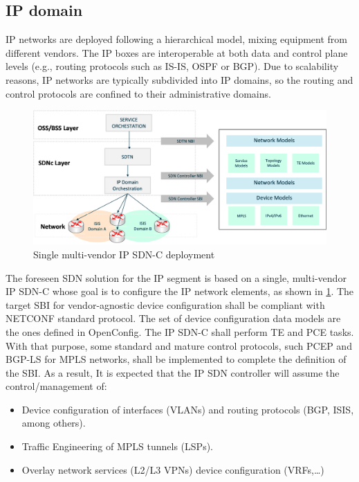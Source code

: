 \documentclass[a4paper,fleqn]{cas-dc}
\begin{document}
\subsection {IP domain}
\label{section:ip}
IP networks are deployed following a hierarchical model, mixing equipment from different vendors. The IP boxes are interoperable at both data and control plane levels (e.g., routing protocols such as IS-IS, OSPF or BGP). Due to scalability reasons, IP networks are typically subdivided into IP domains, so the routing and control protocols are confined to their administrative domains.

\begin{figure}
	\centering
		\includegraphics[scale=0.5]{figs/ifusion_multidomain_2.png}
	\caption{Single multi-vendor IP SDN-C deployment}
	\label{FIG:2}
\end{figure}

The foreseen SDN solution for the IP segment is based on a single, multi-vendor IP SDN-C whose goal is to configure the IP network elements, as shown in \cref{FIG:2}. The target SBI for vendor-agnostic device configuration shall be compliant with NETCONF standard protocol. The set of device configuration data models are the ones defined in OpenConfig. 
The IP SDN-C shall perform TE and PCE tasks. With that purpose, some standard and mature control protocols, such PCEP and BGP-LS for MPLS networks, shall be implemented to complete the definition of the SBI. As a result, It is expected that the IP SDN controller will assume the control/management of:
\begin{itemize}
\item Device configuration of interfaces (VLANs) and routing protocols (BGP, ISIS, among others).
\item Traffic Engineering of MPLS tunnels (LSPs). 
\item Overlay network services (L2/L3 VPNs) device configuration (VRFs,\dots)
\end{itemize}
\end{document}
